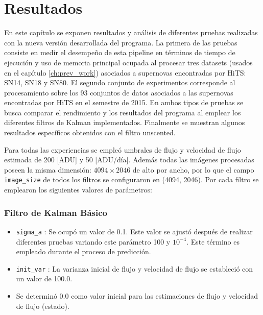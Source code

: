 \chapter{Resultados}
\label{ch:resultados}
En este cap\'itulo se exponen resultados y an\'alisis de diferentes pruebas realizadas con la nueva versi\'on desarrollada del programa. La primera de las pruebas consiste en medir el desempe\~no de esta pipeline en t\'erminos de tiempo de ejecuci\'on y uso de memoria principal ocupada al procesar tres datasets (usados en el cap\'itulo \ref{ch:prev_work}) asociados a supernovas encontradas por HiTS\cite{hits}: SN14, SN18 y SN80. El segundo conjunto de experimentos corresponde al procesamiento sobre los 93 conjuntos de datos asociados a las supernovas encontradas por HiTS en el semestre de 2015. En ambos tipos de pruebas se busca comparar el rendimiento y los resultados del programa al emplear los diferentes filtros de Kalman implementados. Finalmente se muestran algunos resultados espec\'ificos obtenidos con el filtro unscented.
\bigskip


Para todas las experiencias se emple\'o umbrales de flujo y velocidad de flujo estimada de 200 [ADU] y 50 [ADU/d\'ia]. Adem\'as todas las im\'agenes procesadas poseen la misma dimensi\'on: $4094 \times 2046$ de alto por ancho, por lo que el campo \texttt{image\_size} de todos los filtros se configuraron en (4094, 2046). Por cada filtro se emplearon los siguientes valores de par\'ametros:

\subsection*{Filtro de Kalman B\'asico}
\begin{itemize}
\item \texttt{sigma\_a} : Se ocup\'o un valor de 0.1. Este valor se ajust\'o despu\'es de realizar diferentes pruebas variando este par\'ametro 100 y $10^{-4}$. Este t\'ermino es empleado durante el proceso de predicci\'on. 
\item \texttt{init\_var} : La varianza inicial de flujo y velocidad de flujo se estableci\'o con un valor de 100.0.
\item Se determin\'o 0.0 como valor inicial para las estimaciones de flujo y velocidad de flujo (estado).
\end{itemize}
